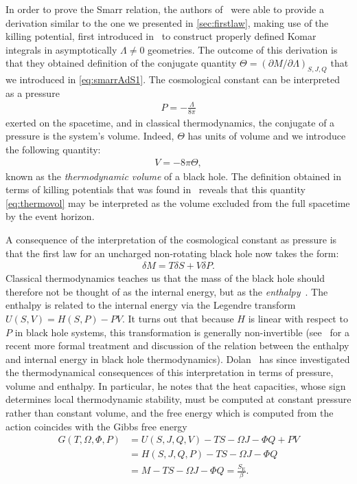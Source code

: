 \documentclass[
twoside,
openright,
frontopenright,
]{dmathesis}
\newcommand{\nn}{\nonumber}
\begin{document}
In order to prove the Smarr relation, the authors of~\cite{Kastor:2009wy} were
able to provide a derivation similar to the one we presented in
\cref{sec:firstlaw}, making use of the killing potential, first introduced
in~\cite{Bazanski:1990qd,Kastor:2008xb} to construct properly defined Komar
integrals in asymptotically $\Lambda\neq 0$ geometries. The outcome of this
derivation is that they obtained definition of the conjugate quantity
$\Theta = (\partial M/\partial \Lambda)_{S,J,Q}$ that we introduced in
\cref{eq:smarrAdS1}. The cosmological constant can be interpreted as a pressure
\begin{align}
  P = -\frac{\Lambda}{8\pi}
\end{align}
exerted on the spacetime, and in classical thermodynamics, the conjugate of a
pressure is the system's volume. Indeed, $\Theta$ has units of volume and we
introduce the following quantity:
\begin{align}
  \label{eq:thermovol}
  V=-8\pi\Theta,
\end{align}
known as the \emph{thermodynamic volume} of a black hole. The definition
obtained in terms of killing potentials that was found in~\cite{Kastor:2009wy}
reveals that this quantity \eqref{eq:thermovol} may be interpreted as the volume
excluded from the full spacetime by the event horizon.

A consequence of the interpretation of the cosmological constant as pressure is
that the first law for an uncharged non-rotating black hole now takes the form:
\begin{align}
  \delta M = T\delta S + V\delta P.
\end{align}
Classical thermodynamics teaches us that the mass of the black hole should
therefore not be thought of as the internal energy, but as the
\emph{enthalpy}~\cite{Kastor:2009wy}. The enthalpy is related to the internal
energy via the Legendre transform $U(S,V) = H(S,P) - PV$. It turns out that
because $H$ is linear with respect to $P$ in black hole systems, this
transformation is generally non-invertible (see~\cite{Baldiotti:2017ywq} for a
recent more formal treatment and discussion of the relation between the enthalpy
and internal energy in black hole
thermodynamics). Dolan~\cite{Dolan:2010ha,Dolan:2011xt} has since investigated
the thermodynamical consequences of this interpretation in terms of pressure,
volume and enthalpy. In particular, he notes that the heat capacities, whose
sign determines local thermodynamic stability, must be computed at constant
pressure rather than constant volume, and the free energy which is computed from
the action coincides with the Gibbs free energy
\begin{align}
  G(T,\Omega,\Phi,P) &= U(S,J,Q,V) - TS - \Omega J - \Phi Q + PV\nn\\
                     &= H(S,J,Q,P) - TS -\Omega J -\Phi Q\nn\\
                     &= M - TS - \Omega J - \Phi Q = \frac{S_\mathrm{E}}{\beta}.
\end{align}
\end{document}
